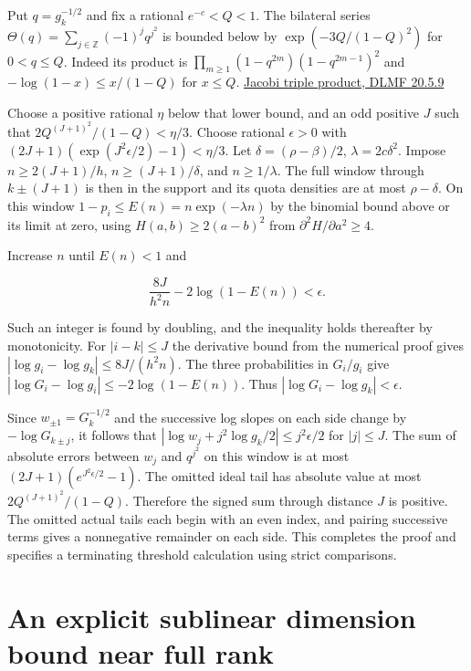 \documentclass[11pt]{article}
\begin{document}
Put $q=g_k^{-1/2}$ and fix a rational $e^{-c}<Q<1$. The bilateral series $\Theta(q)=\sum_{j\in\mathbb Z}(-1)^j q^{j^2}$ is bounded below by $\exp(-3Q/(1-Q)^2)$ for $0<q\le Q$. Indeed its product is $\prod_{m\ge1}(1-q^{2m})(1-q^{2m-1})^2$ and $-\log(1-x)\le x/(1-Q)$ for $x\le Q$. \href{https://dlmf.nist.gov/20.5.E9}{Jacobi triple product, DLMF 20.5.9}

Choose a positive rational $\eta$ below that lower bound, and an odd positive $J$ such that $2Q^{(J+1)^2}/(1-Q)<\eta/3$. Choose rational $\epsilon>0$ with $(2J+1)(\exp(J^2\epsilon/2)-1)<\eta/3$. Let $\delta=(\rho-\beta)/2$, $\lambda=2c\delta^2$. Impose $n\ge 2(J+1)/h$, $n\ge(J+1)/\delta$, and $n\ge1/\lambda$. The full window through $k\pm(J+1)$ is then in the support and its quota densities are at most $\rho-\delta$. On this window $1-p_i\le E(n)=n\exp(-\lambda n)$ by the binomial bound above or its limit at zero, using $H(a,b)\ge 2(a-b)^2$ from $\partial^2 H/\partial a^2\ge4$.

Increase $n$ until $E(n)<1$ and

\begin{equation*}
\frac{8J}{h^2 n}-2\log(1-E(n))<\epsilon.
\end{equation*}

Such an integer is found by doubling, and the inequality holds thereafter by monotonicity. For $|i-k|\le J$ the derivative bound from the numerical proof gives $|\log g_i-\log g_k|\le8J/(h^2 n)$. The three probabilities in $G_i/g_i$ give $|\log G_i-\log g_i|\le-2\log(1-E(n))$. Thus $|\log G_i-\log g_k|<\epsilon$.

Since $w_{\pm1}=G_k^{-1/2}$ and the successive log slopes on each side change by $-\log G_{k\pm j}$, it follows that $|\log w_j+j^2\log g_k/2|\le j^2\epsilon/2$ for $|j|\le J$. The sum of absolute errors between $w_j$ and $q^{j^2}$ on this window is at most $(2J+1)(e^{J^2\epsilon/2}-1)$. The omitted ideal tail has absolute value at most $2Q^{(J+1)^2}/(1-Q)$. Therefore the signed sum through distance $J$ is positive. The omitted actual tails each begin with an even index, and pairing successive terms gives a nonnegative remainder on each side. This completes the proof and specifies a terminating threshold calculation using strict comparisons.

\section{An explicit sublinear dimension bound near full rank}\label{sec:logarithmic}
\end{document}
